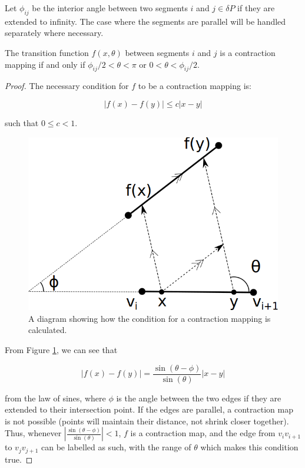 \documentclass[]{styles/svproc}  %
\begin{document}
\begin{definition}
Let $\phi_{ij}$ be the interior angle between two segments $i$ and $j \in \delta P$ if they are extended 
to infinity. The case where the segments are parallel will be handled separately
where necessary.
\end{definition}

\begin{lemma} \label{lemma:angrange}
The transition function $f(x, \theta)$ between
 segments $i$ and $j$ is a contraction mapping if and only if $\phi_{ij}/2 < \theta < \pi$ or $0 < \theta
< \phi_{ij}/2$.
\end{lemma}

\begin{proof}
The necessary condition for $f$ to be a contraction mapping is:

\begin{equation*}
|f(x) - f(y)| \leq c |x-y|
\end{equation*}

such that $0 \leq c < 1$.

\begin{figure}
    \includegraphics[width=0.5\linewidth]{figures/contraction_map_cond.png}
    \centering
    \caption{A diagram showing how the condition for a contraction mapping is
calculated. \label{fig:cont_map}}
    \centering
\end{figure}

From Figure \ref{fig:cont_map}, we can see that

\begin{equation*}
|f(x) - f(y)| = \frac{\sin(\theta - \phi)}{\sin(\theta)} |x-y|
\end{equation*}

from the law of sines, where $\phi$ is the angle between the two edges if they
are extended to their intersection point. If the edges are parallel, a
contraction map is not possible (points will maintain their distance, not shrink
closer together). Thus, whenever $| \frac{\sin(\theta - \phi)}{\sin(\theta)}
| < 1$, $f$ is a contraction map, and the edge from $v_i v_{i+1}$ to $v_j
v_{j+1}$ can be labelled as such, with the range of $\theta$ which makes this
condition true.

\end{proof}
\end{document}
